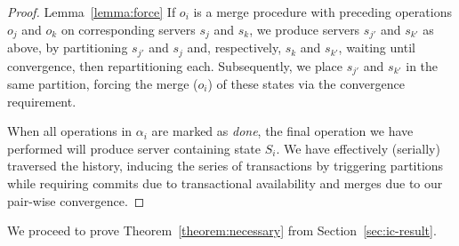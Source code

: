 \begin{proof}{Lemma~\ref{lemma:force}}
If $o_i$ is a merge procedure with preceding operations $o_j$ and $o_k$ on corresponding servers $s_j$ and $s_k$, we produce servers $s_{j'}$ and $s_{k'}$ as above, by partitioning $s_{j'}$ and $s_{j}$ and, respectively, $s_{k}$ and $s_{k'}$, waiting until convergence, then repartitioning each. Subsequently, we place $s_{j'}$ and $s_{k'}$ in the same partition, forcing the merge ($o_i$) of these states via the convergence requirement.

When all operations in $\alpha_i$ are marked as \textit{done}, the final operation we have performed will produce server containing state $S_i$. We have effectively (serially) traversed the history, inducing the series of transactions by triggering partitions while requiring commits due to transactional availability and merges due to our pair-wise convergence.
\end{proof}

We proceed to prove Theorem~\ref{theorem:necessary} from Section~\ref{sec:ic-result}.

